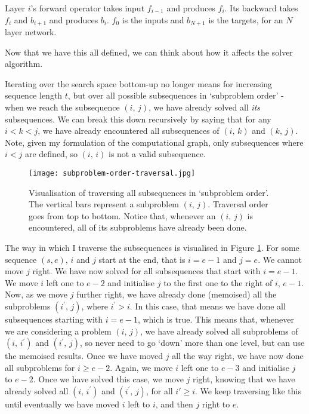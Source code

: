 Layer \(i\)'s forward operator takes input \(f_{i-1}\) and produces \(f_{i}\).
Its backward takes \(f_i\) and \(b_{i+1}\) and produces \(b_i\).
\(f_0\) is the inputs and \(b_{N+1}\) is the targets, for an \(N\) layer network.

Now that we have this all defined, we can think about how it affects the solver algorithm.

Iterating over the search space bottom-up no longer means for increasing sequence length \(t\), but over all possible subsequences in `subproblem order' - when we reach the subsequence \((i,\, j)\), we have already solved all \textit{its} subsequences.
We can break this down recursively by saying that for any \(i < k < j\), we have already encountered all subsequences of \((i,\, k)\) and \((k,\, j)\).
Note, given my formulation of the computational graph, only subsequences where \(i < j\) are defined, so \((i,\, i)\) is not a valid subsequence.

\begin{figure}[h]
    \centering
    \texttt{[image: subproblem-order-traversal.jpg]}
    \caption{Visualisation of traversing all subsequences in `subproblem order'. The vertical bars represent a subproblem \((i,\, j)\). Traversal order goes from top to bottom. Notice that, whenever an \((i,\, j)\) is encountered, all of its subproblems have already been done.}
    \label{fig:3-subproblem-order-traversal}
\end{figure}

The way in which I traverse the subsequences is visualised in Figure \ref{fig:3-subproblem-order-traversal}.
For some sequence \((s, e)\), \(i\) and \(j\) start at the end, that is \(i = e-1\) and \(j=e\).
We cannot move \(j\) right.
We have now solved for all subsequences that start with \(i = e-1\).
We move \(i\) left one to \(e-2\) and initialise \(j\) to the first one to the right of \(i\), \(e-1\).
Now, as we move \(j\) further right, we have already done (memoised) all the subproblems \((i^\prime,\, j)\), where \(i^\prime > i\).
In this case, that means we have done all subsequences starting with \(i=e-1\), which is true.
This means that, whenever we are considering a problem \((i,\, j)\), we have already solved all subproblems of \((i,\, i^\prime)\) and \((i^\prime,\, j)\), so never need to go `down' more than one level, but can use the memoised results.
Once we have moved \(j\) all the way right, we have now done all subproblems for \(i \geq e-2\).
Again, we move \(i\) left one to \(e-3\) and initialise \(j\) to \(e-2\).
Once we have solved this case, we move \(j\) right, knowing that we have already solved all \((i,\, i^\prime)\) and \((i^\prime,\, j)\), for all \(i' \geq i\).
We keep traversing like this until eventually we have moved \(i\) left to \(i\), and then \(j\) right to \(e\).

